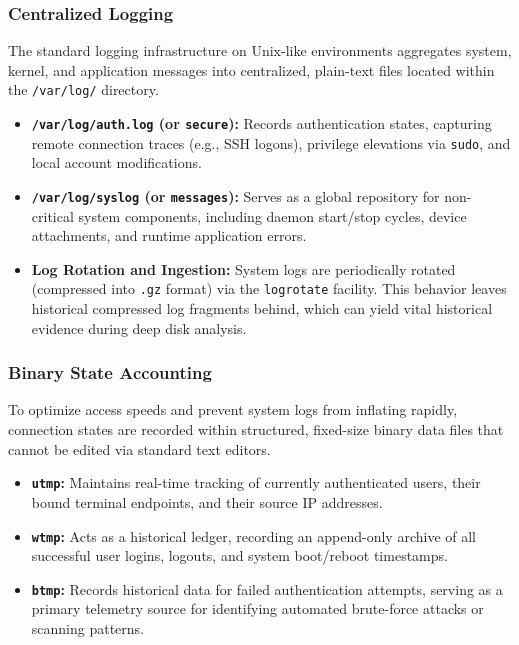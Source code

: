 \subsubsection*{Centralized Logging}
The standard logging infrastructure on Unix-like environments aggregates system, kernel, and application messages into centralized, plain-text files located within the \texttt{/var/log/} directory.

\begin{itemize}
    \item \textbf{\texttt{/var/log/auth.log} (or \texttt{secure}):} Records authentication states, capturing remote connection traces (e.g., SSH logons), privilege elevations via \texttt{sudo}, and local account modifications.
    \item \textbf{\texttt{/var/log/syslog} (or \texttt{messages}):} Serves as a global repository for non-critical system components, including daemon start/stop cycles, device attachments, and runtime application errors.
    \item \textbf{Log Rotation and Ingestion:} System logs are periodically rotated (compressed into \texttt{.gz} format) via the \texttt{logrotate} facility. This behavior leaves historical compressed log fragments behind, which can yield vital historical evidence during deep disk analysis.
\end{itemize}

\subsubsection*{Binary State Accounting}
To optimize access speeds and prevent system logs from inflating rapidly, connection states are recorded within structured, fixed-size binary data files that cannot be edited via standard text editors.
\begin{itemize}
    \item \textbf{\texttt{utmp}:} Maintains real-time tracking of currently authenticated users, their bound terminal endpoints, and their source IP addresses.
    \item \textbf{\texttt{wtmp}:} Acts as a historical ledger, recording an append-only archive of all successful user logins, logouts, and system boot/reboot timestamps.
    \item \textbf{\texttt{btmp}:} Records historical data for failed authentication attempts, serving as a primary telemetry source for identifying automated brute-force attacks or scanning patterns.
\end{itemize}

